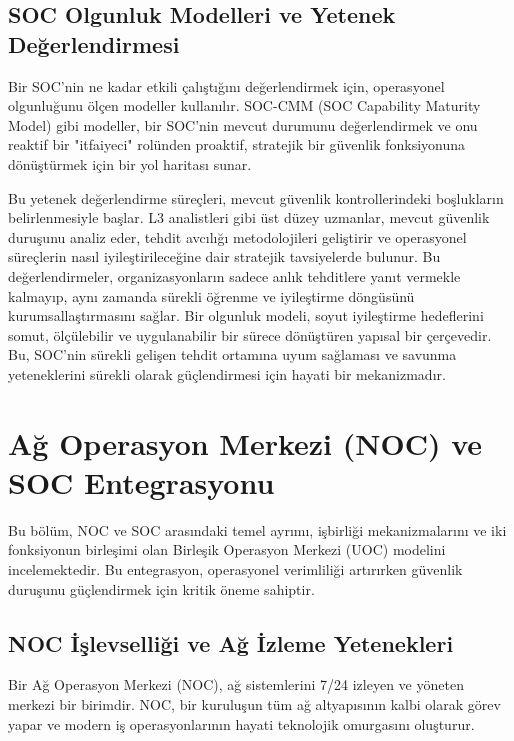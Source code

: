 \subsection{SOC Olgunluk Modelleri ve Yetenek Değerlendirmesi}

Bir SOC'nin ne kadar etkili çalıştığını değerlendirmek için, operasyonel olgunluğunu ölçen modeller kullanılır. SOC-CMM (SOC Capability Maturity Model) gibi modeller, bir SOC'nin mevcut durumunu değerlendirmek ve onu reaktif bir "itfaiyeci" rolünden proaktif, stratejik bir güvenlik fonksiyonuna dönüştürmek için bir yol haritası sunar.

Bu yetenek değerlendirme süreçleri, mevcut güvenlik kontrollerindeki boşlukların belirlenmesiyle başlar. L3 analistleri gibi üst düzey uzmanlar, mevcut güvenlik duruşunu analiz eder, tehdit avcılığı metodolojileri geliştirir ve operasyonel süreçlerin nasıl iyileştirileceğine dair stratejik tavsiyelerde bulunur. Bu değerlendirmeler, organizasyonların sadece anlık tehditlere yanıt vermekle kalmayıp, aynı zamanda sürekli öğrenme ve iyileştirme döngüsünü kurumsallaştırmasını sağlar. Bir olgunluk modeli, soyut iyileştirme hedeflerini somut, ölçülebilir ve uygulanabilir bir sürece dönüştüren yapısal bir çerçevedir. Bu, SOC'nin sürekli gelişen tehdit ortamına uyum sağlaması ve savunma yeteneklerini sürekli olarak güçlendirmesi için hayati bir mekanizmadır.

\section{Ağ Operasyon Merkezi (NOC) ve SOC Entegrasyonu}

Bu bölüm, NOC ve SOC arasındaki temel ayrımı, işbirliği mekanizmalarını ve iki fonksiyonun birleşimi olan Birleşik Operasyon Merkezi (UOC) modelini incelemektedir. Bu entegrasyon, operasyonel verimliliği artırırken güvenlik duruşunu güçlendirmek için kritik öneme sahiptir.

\subsection{NOC İşlevselliği ve Ağ İzleme Yetenekleri}

Bir Ağ Operasyon Merkezi (NOC), ağ sistemlerini 7/24 izleyen ve yöneten merkezi bir birimdir. NOC, bir kuruluşun tüm ağ altyapısının kalbi olarak görev yapar ve modern iş operasyonlarının hayati teknolojik omurgasını oluşturur.

